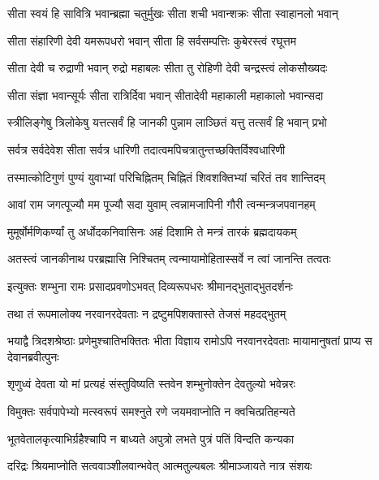 \twolineshloka
{सीता स्वयं हि सावित्रि भवान्ब्रह्मा चतुर्मुखः}
{सीता शची भवान्शक्रः सीता स्वाहानलो भवान्}%

\twolineshloka
{सीता संहारिणी देवी यमरूपधरो भवान्}
{सीता हि सर्वसम्पत्तिः कुबेरस्त्वं रघूत्तम}%

\twolineshloka
{सीता देवी च रुद्राणी भवान् रुद्रो महाबलः}
{सीता तु रोहिणी देवी चन्द्रस्त्वं लोकसौख्यदः}%

\twolineshloka
{सीता संज्ञा भवान्सूर्यः सीता रात्रिर्दिवा भवान्}
{सीतादेवी महाकाली महाकालो भवान्सदा}%

\twolineshloka
{स्त्रीलिङ्गेषु त्रिलोकेषु यत्तत्सर्वं हि जानकी}
{पुन्नाम लाञ्छितं यत्तु तत्सर्वं हि भवान् प्रभो}%

\twolineshloka
{सर्वत्र सर्वदेवेश सीता सर्वत्र धारिणी}
{तदात्वमपिचत्रातुन्तच्छक्तिर्विश्वधारिणी}%

\twolineshloka
{तस्मात्कोटिगुणं पुण्यं युवाभ्यां परिचिह्नितम्}
{चिह्नितं शिवशक्तिभ्यां चरितं तव शान्तिदम्}%

\twolineshloka
{आवां राम जगत्पूज्यौ मम पूज्यौ सदा युवाम्}
{त्वन्नामजापिनी गौरी त्वन्मन्त्रजपवानहम्}%

\twolineshloka
{मुमूर्षोर्मणिकर्ण्यां तु अर्धोदकनिवासिनः}
{अहं दिशामि ते मन्त्रं तारकं ब्रह्मदायकम्}%

\twolineshloka
{अतस्त्वं जानकीनाथ परब्रह्मासि निश्चितम्}
{त्वन्मायामोहितास्सर्वे न त्वां जानन्ति तत्वतः}%


\twolineshloka
{इत्युक्तः शम्भुना रामः प्रसादप्रवणोऽभवत्}
{दिव्यरूपधरः श्रीमानद्भुताद्भुतदर्शनः}%

\twolineshloka
{तथा तं रूपमालोक्य नरवानरदेवताः}
{न द्रष्टुमपिशक्तास्ते तेजसं महदद्भुतम्}%


\threelineshloka
{भयाद्वै त्रिदशश्रेष्ठाः प्रणेमुश्चातिभक्तितः}
{भीता विज्ञाय रामोऽपि नरवानरदेवताः}
{मायामानुषतां प्राप्य स देवानब्रवीत्पुनः}%


\twolineshloka
{शृणुध्वं देवता यो मां प्रत्यहं संस्तुविष्यति}
{स्तवेन शम्भुनोक्तेन देवतुल्यो भवेन्नरः}%

\twolineshloka
{विमुक्तः सर्वपापेभ्यो मत्स्वरूपं समश्नुते}
{रणे जयमवाप्नोति न क्वचित्प्रतिहन्यते}%

\twolineshloka
{भूतवेतालकृत्याभिर्ग्रहैश्चापि न बाध्यते}
{अपुत्रो लभते पुत्रं पतिं विन्दति कन्यका}%

\twolineshloka
{दरिद्रः श्रियमाप्नोति सत्ववाञ्शीलवान्भवेत्}
{आत्मतुल्यबलः श्रीमाञ्जायते नात्र संशयः}%

